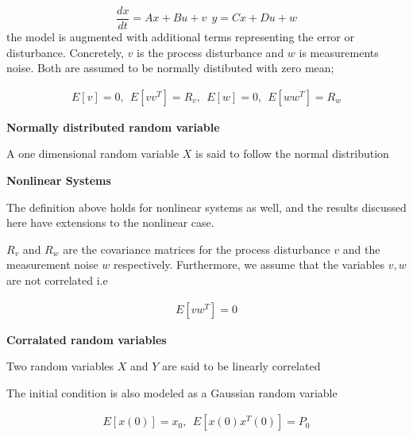 \begin{equation}
\frac{dx}{dt} = Ax + Bu +v  ~~ y = Cx + Du +w 
\end{equation}
the model is augmented with additional terms representing the error or disturbance. Concretely,
$v$ is the process disturbance and $w$ is measurements noise. Both are assumed to be normally distibuted with zero mean;

\begin{eqnarray}
E[v] = 0, ~~ E[vv^T] = R_v, ~~ E[w] = 0, ~~ E[ww^T] = R_w 
\label{noise_proccess_1} 
\end{eqnarray}



\begin{framed}
\theoremstyle{remark}
\begin{remark}{\textbf{Normally distributed random variable}}

A one dimensional random variable $X$ is said to follow the normal distribution
\end{remark}
\end{framed}


\begin{framed}
\theoremstyle{remark}
\begin{remark}{\textbf{Nonlinear Systems}}

The definition above holds for nonlinear systems as well, and the results discussed here have extensions to the nonlinear case.
\end{remark}
\end{framed}

$R_v$ and $R_w$ are the covariance matrices for the process disturbance $v$ and the measurement noise $w$ respectively. Furthermore, we assume that the variables $v, w$ are not correlated i.e 

\begin{eqnarray}
E[vw^T] = 0
\label{noise_proccess_2} 
\end{eqnarray}


\begin{framed}
\theoremstyle{remark}
\begin{remark}{\textbf{Corralated random variables}}

Two random variables $X$ and $Y$ are said to be linearly correlated 
\end{remark}
\end{framed}

The initial condition is also modeled as a Gaussian random variable

\begin{eqnarray}
E[x(0)] = x_0, ~~ E[x(0)x^{T}(0)] = P_0
\label{noise_proccess_3} 
\end{eqnarray}

